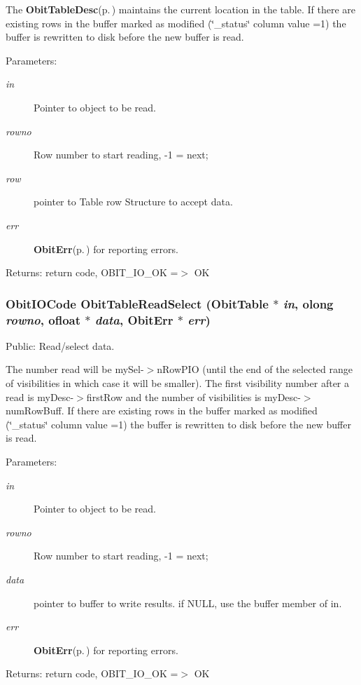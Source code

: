 The {\bf Obit\-Table\-Desc}{\rm (p.\,\pageref{structObitTableDesc})} maintains the current location in the table. If there are existing rows in the buffer marked as modified (\char`\"{}\_\-status\char`\"{} column value =1) the buffer is rewritten to disk before the new buffer is read. \begin{Desc}
\item[Parameters:]
\begin{description}
\item[{\em in}]Pointer to object to be read. \item[{\em rowno}]Row number to start reading, -1 = next; \item[{\em row}]pointer to Table row Structure to accept data. \item[{\em err}]{\bf Obit\-Err}{\rm (p.\,\pageref{structObitErr})} for reporting errors. \end{description}
\end{Desc}
\begin{Desc}
\item[Returns:]return code, OBIT\_\-IO\_\-OK =$>$ OK \end{Desc}
\subsubsection{\setlength{\rightskip}{0pt plus 5cm}Obit\-IOCode Obit\-Table\-Read\-Select ({\bf Obit\-Table} $\ast$ {\em in}, {\bf olong} {\em rowno}, {\bf ofloat} $\ast$ {\em data}, {\bf Obit\-Err} $\ast$ {\em err})}\label{ObitTable_8c_a27}


Public: Read/select data. 

The number read will be my\-Sel-$>$n\-Row\-PIO (until the end of the selected range of visibilities in which case it will be smaller). The first visibility number after a read is my\-Desc-$>$first\-Row and the number of visibilities is my\-Desc-$>$num\-Row\-Buff. If there are existing rows in the buffer marked as modified (\char`\"{}\_\-status\char`\"{} column value =1) the buffer is rewritten to disk before the new buffer is read. \begin{Desc}
\item[Parameters:]
\begin{description}
\item[{\em in}]Pointer to object to be read. \item[{\em rowno}]Row number to start reading, -1 = next; \item[{\em data}]pointer to buffer to write results. if NULL, use the buffer member of in. \item[{\em err}]{\bf Obit\-Err}{\rm (p.\,\pageref{structObitErr})} for reporting errors. \end{description}
\end{Desc}
\begin{Desc}
\item[Returns:]return code, OBIT\_\-IO\_\-OK =$>$ OK \end{Desc}
